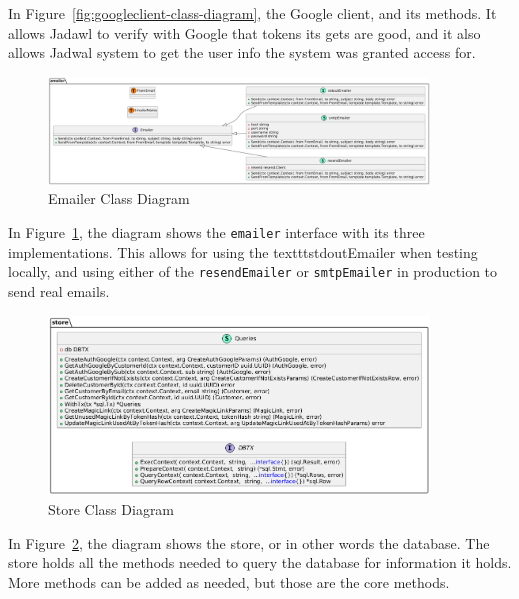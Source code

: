 In Figure~\ref{fig:googleclient-class-diagram}, the Google client, and its methods.
It allows Jadawl to verify with Google that tokens its gets are good, and it also allows Jadwal system to get the user info the system was granted access for.



\begin{figure}[!h]
    \centering
    \includegraphics[width=0.9\textwidth]{images/docs/diagrams/class/class-diagram/emailer.png}
    \caption{Emailer Class Diagram}
    \label{fig:emailer-class-diagram}
\end{figure}

In Figure~\ref{fig:emailer-class-diagram}, the diagram shows the \texttt{emailer} interface with its three implementations. This allows for using the texttt{stdoutEmailer} when testing locally, and using either of the \texttt{resendEmailer} or \texttt{smtpEmailer} in production to send real emails.



\begin{figure}[!h]
    \centering
    \includegraphics[width=0.9\textwidth]{images/docs/diagrams/class/class-diagram/store.png}
    \caption{Store Class Diagram}
    \label{fig:store-class-diagram}
\end{figure}

In Figure~\ref{fig:store-class-diagram}, the diagram shows the store, or in other words the database. The store holds all the methods needed to query the database for information it holds. More methods can be added as needed, but those are the core methods.



